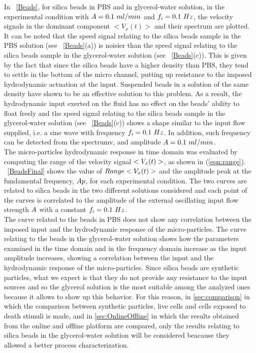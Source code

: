 \documentclass[journal]{IEEEtran}
\theoremstyle{definition}
\theoremstyle{remark}
\begin{document}
In ~\fig\ref{Beads}, for silica beads in PBS and in glycerol-water solution, in the experimental condition with $A=0.1~ml/min$ and  $f_i=0.1~Hz$, the velocity signals in the dominant component  $<V_x(t)>$ and their spectrum are plotted.
It can be noted that the speed signal relating to the silica beads sample in the PBS solution (see ~\fig\ref{Beads}(a)) is noisier than the speed signal relating to the silica beads sample in the glycerol-water solution (see ~\fig\ref{Beads}(c)). This is given by the fact that since the silica beads have a higher density than PBS, they tend to settle in the bottom of the micro channel, putting up resistance to the imposed hydrodynamic actuation at the input. Suspended beads in a solution of the same density have shown to be an effective solution to this problem. As a result, the hydrodynamic input exerted on the fluid has no effect on the beads' ability to float freely and the speed signal relating to the silica beads sample in the glycerol-water solution (see ~\fig\ref{Beads}(c)) shows a shape similar to the input flow supplied, i.e. a sine wave with frequency $f_i=0.1~Hz$. In addition, such frequency can be detected from the spectrumv, and amplitude $A=0.1~ml/min$.
\\The micro-particles hydrodynamic response in time domain was evaluated by computing the range of the velocity signal $<V_{x}(t)>$, as shown in \eqn (\ref{eqn:range}). ~\fig\ref{BeadsFinal} shows the value of $Range<V_x(t)>$ and the amplitude peak at the fundamental frequency, $Ap$, for each experimental condition. The two curves are related to silica beads in the two different solutions considered and each point of the curves is correlated to the amplitude of the external oscillating input flow strength $A$ with a constant $f_i=0.1~Hz$. 
\\The curve related to the beads in PBS does not show any correlation between the imposed input and the hydrodynamic response of the micro-particles. The curve relating to the beads in the glycerol-water solution shows how the parameters examined in the time domain and in the frequency domain increase as the input amplitude increases, showing a correlation between the input and the hydrodynamic response of the micro-particles.
Since silica beads are synthetic particles, what we expect is that they do not provide any resistance to the input sources and so the glycerol solution is the most suitable among the analyzed ones because it allows to show up this behavior.
For this reason, in \sect\ref{sec:comparison} in which the comparison between synthetic particles, live cells and cells exposed to death stimuli is made, and in \sect\ref{sec:OnlineOffline} in which the results obtained from the online and offline platform are compared, only the results relating to silica beads in the glycerol-water solution will be considered beacause they allowed a better process characterization.
\end{document}
